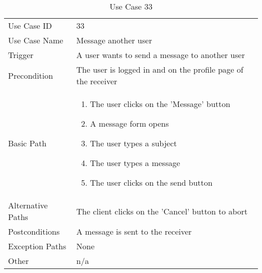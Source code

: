 \begin{table}[H]
\centering
\label{table-use-case-33}
\begin{tabular}{|p{3cm}|p{10cm}}
Use Case ID       & 33                                                           
\\
Use Case Name     & Message another user                                                         
\\
Trigger           & A user wants to send a message to another user
\\
Precondition      & The user is logged in and on the profile page of the
receiver
\\
Basic Path        & \begin{enumerate}

\item The user clicks on the 'Message' button
\item A message form opens
\item The user types a subject
\item The user types a message
\item The user clicks on the send button
\end{enumerate} 
     \\
Alternative Paths & The client clicks on the 'Cancel' button to abort                        
\\
Postconditions    & A message is sent to the receiver
\\
Exception Paths   & None                          \\
Other             & n/a                                                                                                                                                                                                        
\end{tabular}
\caption{Use Case 33}
\end{table}


